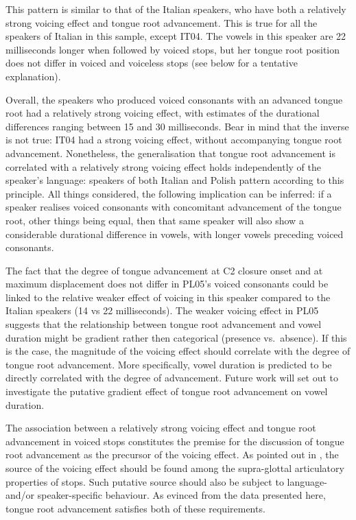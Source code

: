 \documentclass[authoryear, 5p]{elsarticle}
\begin{document}
This pattern is similar to that of the Italian speakers, who have both a
relatively strong voicing effect and tongue root advancement. This is
true for all the speakers of Italian in this sample, except IT04. The
vowels in this speaker are 22 milliseconds longer when followed by
voiced stops, but her tongue root position does not differ in voiced and
voiceless stops (see below for a tentative explanation).

Overall, the speakers who produced voiced consonants with an advanced
tongue root had a relatively strong voicing effect, with estimates of
the durational differences ranging between 15 and 30 milliseconds. Bear
in mind that the inverse is not true: IT04 had a strong voicing effect,
without accompanying tongue root advancement. Nonetheless, the
generalisation that tongue root advancement is correlated with a
relatively strong voicing effect holds independently of the speaker's
language: speakers of both Italian and Polish pattern according to this
principle. All things considered, the following implication can be
inferred: if a speaker realises voiced consonants with concomitant
advancement of the tongue root, other things being equal, then that same
speaker will also show a considerable durational difference in vowels,
with longer vowels preceding voiced consonants.

The fact that the degree of tongue advancement at C2 closure onset and
at maximum displacement does not differ in PL05's voiced consonants
could be linked to the relative weaker effect of voicing in this speaker
compared to the Italian speakers (14 vs 22 milliseconds). The weaker
voicing effect in PL05 suggests that the relationship between tongue
root advancement and vowel duration might be gradient rather then
categorical (presence vs.~absence). If this is the case, the magnitude
of the voicing effect should correlate with the degree of tongue root
advancement. More specifically, vowel duration is predicted to be
directly correlated with the degree of advancement. Future work will set
out to investigate the putative gradient effect of tongue root
advancement on vowel duration.

The association between a relatively strong voicing effect and tongue
root advancement in voiced stops constitutes the premise for the
discussion of tongue root advancement as the precursor of the voicing
effect. As pointed out in , the source of the voicing
effect should be found among the supra-glottal articulatory properties
of stops. Such putative source should also be subject to language-
and/or speaker-specific behaviour. As evinced from the data presented
here, tongue root advancement satisfies both of these requirements.
\end{document}
